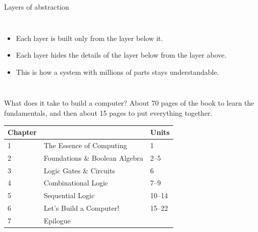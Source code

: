 \documentclass[10pt]{wosm-slides}
\begin{document}
\begin{frame}{Layers of abstraction}
  \begin{columns}[T]
      \begin{itemize}
        \item Each layer is built only from the layer below it.
        \item Each layer hides the details of the layer below from the layer above.
        \item This is how a system with millions of parts stays understandable.
      \end{itemize}
      \medskip
  \end{columns}
\end{frame}

\begin{frame}{What does it take to build a computer?}
  About 70 pages of the book to learn the fundamentals, and then about 15 pages to
  put everything together.

  \bigskip
  \begin{tabular}{@{}lll@{}}
    \toprule
    Chapter & & Units \\
    \midrule
    1 & The Essence of Computing & 1 \\
    2 & Foundations \& Boolean Algebra & 2--5 \\
    3 & Logic Gates \& Circuits & 6 \\
    4 & Combinational Logic & 7--9 \\
    5 & Sequential Logic & 10--14 \\
    6 & Let's Build a Computer! & 15--22 \\
    7 & Epilogue & \\
    \bottomrule
  \end{tabular}
\end{frame}
\end{document}
